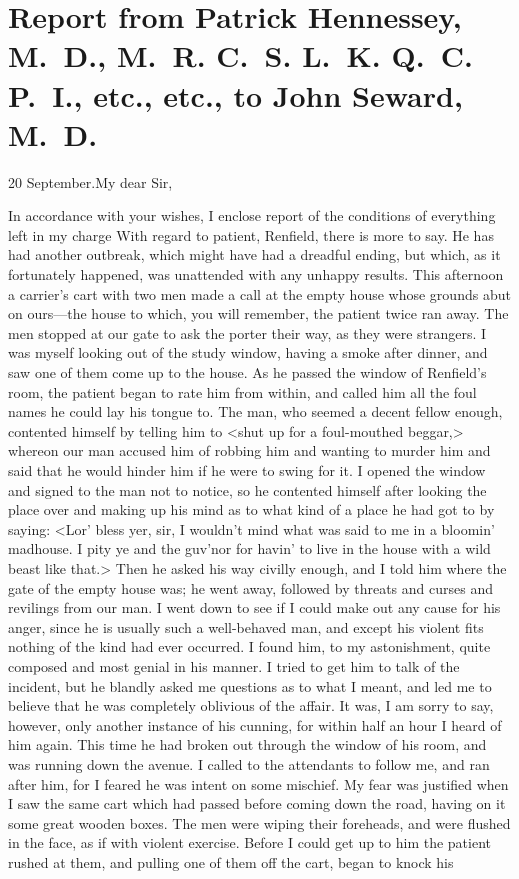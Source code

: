 \begin{a4}
	\clearpage
\end{a4}

\section{Report from Patrick Hennessey, M\@.~D\@., M\@.~R\@. C\@.~S\@. L\@.~K\@. Q\@.~C\@. P\@.~I\@., etc., etc., to John Seward, M\@.~D\@.}

\begin{mail}{20 September.}{My dear Sir,}

In accordance with your wishes, I enclose report of the conditions of everything left in my charge With regard to patient, Renfield, there is more to say. He has had another outbreak, which might have had a dreadful ending, but which, as it fortunately happened, was unattended with any unhappy results. This afternoon a carrier's cart with two men made a call at the empty house whose grounds abut on ours—the house to which, you will remember, the patient twice ran away. The men stopped at our gate to ask the porter their way, as they were strangers. I was myself looking out of the study window, having a smoke after dinner, and saw one of them come up to the house. As he passed the window of Renfield's room, the patient began to rate him from within, and called him all the foul names he could lay his tongue to. The man, who seemed a decent fellow enough, contented himself by telling him to <shut up for a foul-mouthed beggar,> whereon our man accused him of robbing him and wanting to murder him and said that he would hinder him if he were to swing for it. I opened the window and signed to the man not to notice, so he contented himself after looking the place over and making up his mind as to what kind of a place he had got to by saying: <Lor' bless yer, sir, I wouldn't mind what was said to me in a bloomin' madhouse. I pity ye and the guv'nor for havin' to live in the house with a wild beast like that.> Then he asked his way civilly enough, and I told him where the gate of the empty house was; he went away, followed by threats and curses and revilings from our man. I went down to see if I could make out any cause for his anger, since he is usually such a well-behaved man, and except his violent fits nothing of the kind had ever occurred. I found him, to my astonishment, quite composed and most genial in his manner. I tried to get him to talk of the incident, but he blandly asked me questions as to what I meant, and led me to believe that he was completely oblivious of the affair. It was, I am sorry to say, however, only another instance of his cunning, for within half an hour I heard of him again. This time he had broken out through the window of his room, and was running down the avenue. I called to the attendants to follow me, and ran after him, for I feared he was intent on some mischief. My fear was justified when I saw the same cart which had passed before coming down the road, having on it some great wooden boxes. The men were wiping their foreheads, and were flushed in the face, as if with violent exercise. Before I could get up to him the patient rushed at them, and pulling one of them off the cart, began to knock his 
\end{mail}

